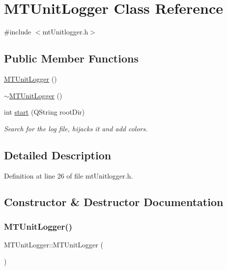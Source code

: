 \hypertarget{class_m_t_unit_logger}{}\section{M\+T\+Unit\+Logger Class Reference}
\label{class_m_t_unit_logger}


{\ttfamily \#include $<$mt\+Unitlogger.\+h$>$}

\subsection*{Public Member Functions}
\begin{DoxyCompactItemize}
\item 
\mbox{\hyperlink{class_m_t_unit_logger_ab878ff7dbc267dc7028846f0b1c657b8}{M\+T\+Unit\+Logger}} ()
\item 
\mbox{\hyperlink{class_m_t_unit_logger_a249a83d04603d90af2ab7ba7a0245093}{$\sim$\+M\+T\+Unit\+Logger}} ()
\item 
int \mbox{\hyperlink{class_m_t_unit_logger_ae93ca7c78500192d14aba3dcd73ba37e}{start}} (Q\+String root\+Dir)
\begin{DoxyCompactList}\small\item\em Search for the log file, hijacks it and add colors. \end{DoxyCompactList}\end{DoxyCompactItemize}


\subsection{Detailed Description}


Definition at line 26 of file mt\+Unitlogger.\+h.



\subsection{Constructor \& Destructor Documentation}
\mbox{\label{class_m_t_unit_logger_ab878ff7dbc267dc7028846f0b1c657b8}} 
\subsubsection{\texorpdfstring{M\+T\+Unit\+Logger()}{MTUnitLogger()}}
{\footnotesize\ttfamily M\+T\+Unit\+Logger\+::\+M\+T\+Unit\+Logger (\begin{DoxyParamCaption}{ }\end{DoxyParamCaption})\hspace{0.3cm}{\ttfamily [inline]}}



